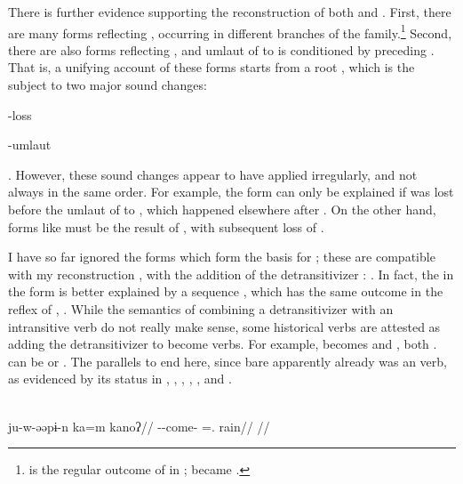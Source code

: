There is further evidence supporting the reconstruction of both  and .
First, there are many forms reflecting \colorbox{come2}{}, occurring in different branches of the family.\footnote{ is the regular outcome of  in \uxc;  became  \parencite[176]{meira2005southern}.}
Second, there are also forms reflecting \colorbox{come3}{}, and umlaut of  to  is conditioned by preceding  \parencite{meira2010origin}.
That is, a unifying account of these forms starts from a root , which is the subject to two major sound changes: \begin{inlinelist}
 \item {}-loss
 \item {}-umlaut	
 \end{inlinelist}.
However, these sound changes appear to have applied irregularly, and not always in the same order.
For example, the \kalina form  can only be explained if  was lost before the umlaut of  to , which happened elsewhere after .
On the other hand, forms like \maqui {} must be the result of , with subsequent loss of .

I have so far ignored the forms which form the basis for  ; these are compatible with my reconstruction , with the addition of the detransitivizer : \colorbox{come4}{}.
In fact, the  in the \akawaio form  is better explained by a sequence , which has the same outcome in the \macushi reflex of , .
While the semantics of combining a detransitivizer with an intransitive verb do not really make sense, some historical  verbs are attested as adding the detransitivizer to become  verbs.
For example,    becomes \trio {} \parencite[252]{triomeira1999} and \kalina {} \parencite[429]{courtz2008carib}, both .
\waiwai {} can be  \parencite[30]{waiwaihawkins1998} or  \parencite[204]{hawkins1953waiwai}.
The parallels to  end here, since bare   apparently already was an  verb, as evidenced by its status in \kaxui, \kalina, \panare {}, \arara, \trio, and \akuriyo.

\panare \parencite[][65]{panarepayne2013}\\
\begingl
\gla ju-w-əəpɨ-n ka=m kanoʔ//
\glb {}--come- =. rain//
\glft {}//
\endgl
\xe

